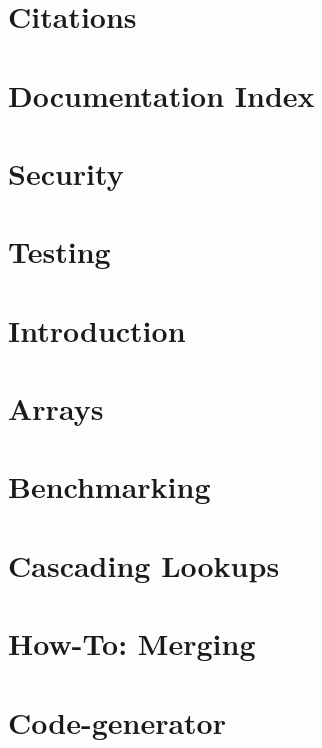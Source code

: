 \let\mypdfximage\pdfximage\def\pdfximage{\immediate\mypdfximage}\documentclass[twoside]{book}
\newcommand{\+}{\discretionary{\mbox{\scriptsize$\hookleftarrow$}}{}{}}
\begin{document}
\chapter{Citations}
\label{doc_paper_README_md}

\chapter{Documentation Index}
\label{doc_README_md}

\chapter{Security}
\label{doc_SECURITY_md}

\chapter{Testing}
\label{doc_TESTING_md}

\chapter{Introduction}
\label{doc_tutorials_application-integration_md}

\chapter{Arrays}
\label{doc_tutorials_arrays_md}

\chapter{Benchmarking}
\label{doc_tutorials_benchmarking_md}

\chapter{Cascading Lookups}
\label{doc_tutorials_cascading_md}

\chapter{How-\/\+To\+: Merging}
\label{doc_tutorials_cmerge_md}

\chapter{Code-\/generator}
\label{doc_tutorials_code-generator_md}

\end{document}
